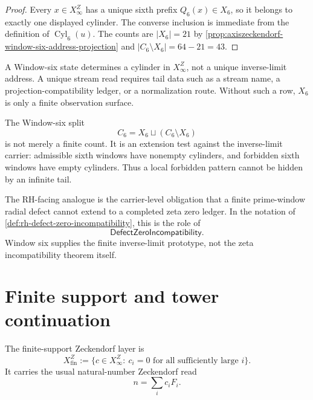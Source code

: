 \begin{proof}
Every $x\in X_\infty^Z$ has a unique sixth prefix $Q_6(x)\in X_6$, so it
belongs to exactly one displayed cylinder.  The converse inclusion is
immediate from the definition of $\operatorname{Cyl}_6(u)$.  The counts are
$|X_6|=21$ by
\autoref{prop:axiszeckendorf-window-six-address-projection} and
$|C_6\setminus X_6|=64-21=43$.
\end{proof}

\begin{principle}
\label{prin:axiszeckendorf-window-not-unique-stream}
A Window-six state determines a cylinder in $X_\infty^Z$, not a unique
inverse-limit address.  A unique stream read requires tail data such as a
stream name, a projection-compatibility ledger, or a normalization route.
Without such a row, $X_6$ is only a finite observation surface.
\end{principle}

\begin{principle}
\label{prin:axiszeckendorf-finite-obstruction-inverse-limit-refusal}
The Window-six split
$$
C_6=X_6\sqcup(C_6\setminus X_6)
$$
is not merely a finite count.  It is an extension test against the
inverse-limit carrier: admissible sixth windows have nonempty cylinders,
and forbidden sixth windows have empty cylinders.  Thus a local forbidden
pattern cannot be hidden by an infinite tail.

The RH-facing analogue is the carrier-level obligation that a finite
prime-window radial defect cannot extend to a completed zeta zero ledger.
In the notation of
\autoref{def:rh-defect-zero-incompatibility}, this is the role of
$$
\mathsf{DefectZeroIncompatibility}.
$$
Window six supplies the finite inverse-limit prototype, not the zeta
incompatibility theorem itself.
\end{principle}

\section{Finite support and tower continuation}
\label{sec:axiszeckendorf-finite-support-and-continuation}

\begin{definition}
\label{def:axiszeckendorf-finite-support-layer}
The finite-support Zeckendorf layer is
$$
X_{\mathrm{fin}}^Z
:=
\{c\in X_\infty^Z:\ c_i=0\text{ for all sufficiently large }i\}.
$$
It carries the usual natural-number Zeckendorf read
$$
n=\sum_i c_iF_i.
$$
\end{definition}


